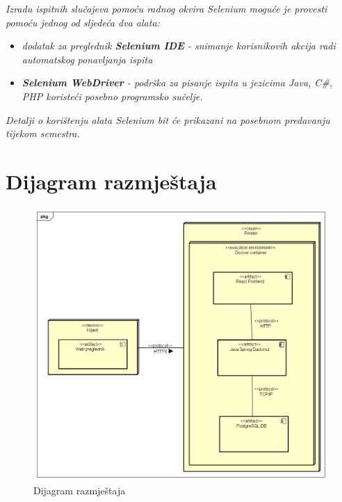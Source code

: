 			 \textit{Izradu ispitnih slučajeva pomoću radnog okvira Selenium moguće je provesti pomoću jednog od sljedeća dva alata:}
			 \begin{itemize}
			 	\item \textit{dodatak za preglednik \textbf{Selenium IDE} - snimanje korisnikovih akcija radi automatskog ponavljanja ispita	}
			 	\item \textit{\textbf{Selenium WebDriver} - podrška za pisanje ispita u jezicima Java, C\#, PHP koristeći posebno programsko sučelje.}
			 \end{itemize}
		 	\textit{Detalji o korištenju alata Selenium bit će prikazani na posebnom predavanju tijekom semestra.}
			
			\eject 
		
		
		\section{Dijagram razmještaja}
			
			
			 
			 \begin{figure}[H]
			 	\includegraphics[width=\textwidth]{slike/DeploymentDiagram.PNG}
			 	\caption{Dijagram razmještaja}
			 	\label{fig:deploymentDiagram}
			 \end{figure}
			 
